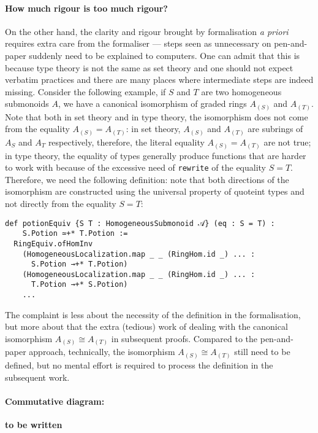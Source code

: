 \documentclass[graybox]{svmult}
\begin{document}
\paragraph{How much rigour is too much rigour?}%
On the other hand, the clarity and rigour brought by formalisation \textit{a priori} requires extra 
care from the formaliser --- steps seen as unnecessary on pen-and-paper suddenly need to 
be explained to computers. One can admit that this is because type theory is not the same as set theory and 
one should not expect verbatim practices and there are many places where intermediate steps are indeed missing.
Consider the following example, if $S$ and $T$ are two homogeneous submonoids $A$, we have a canonical isomorphism of graded rings
$A_{(S)}$ and $A_{(T)}$. 
Note that both in set theory and in type theory, the isomorphism does not come from the equality $A_{(S)} = A_{(T)}$:
in set theory, $A_{(S)}$ and $A_{(T)}$ are subrings of $A_S$ and $A_T$ respectively,  
therefore, the literal equality $A_{(S)} = A_{(T)}$ are not true; 
in type theory, the equality of types generally produce functions that are harder to work with because of the excessive need of \lstinline|rewrite| of the equality $S = T$.
Therefore, we need the following definition: note that both directions of the isomorphism are constructed
using the universal property of quoteint types and not directly from the equality $S = T$:
\begin{lstlisting}
def potionEquiv {S T : HomogeneousSubmonoid 𝒜} (eq : S = T) : 
    S.Potion ≃+* T.Potion := 
  RingEquiv.ofHomInv
    (HomogeneousLocalization.map _ _ (RingHom.id _) ... : 
      S.Potion →+* T.Potion)
    (HomogeneousLocalization.map _ _ (RingHom.id _) ... : 
      T.Potion →+* S.Potion)
    ...
\end{lstlisting}
The complaint is less about the necessity of the definition in the formalisation, but more about that 
the extra (tedious) work of dealing with the canonical isomorphism $A_{(S)} \cong A_{(T)}$ in subsequent proofs.
Compared to the pen-and-paper approach, technically, the isomorphism $A_{(S)} \cong A_{(T)}$ still need to be defined, 
but no mental effort is required to process the definition in the subsequent work.


\paragraph{Commutative diagram:}%
{\bf to be written}
\end{document}

